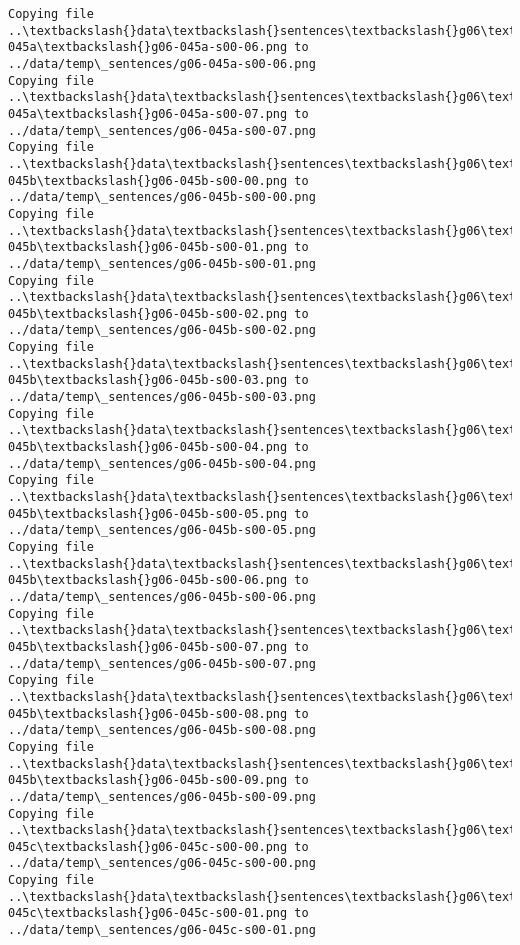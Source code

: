 \documentclass[11pt]{article}
\begin{document}
\begin{Verbatim}[commandchars=\\\{\}]
Copying file ..\textbackslash{}data\textbackslash{}sentences\textbackslash{}g06\textbackslash{}g06-045a\textbackslash{}g06-045a-s00-06.png to
../data/temp\_sentences/g06-045a-s00-06.png
Copying file ..\textbackslash{}data\textbackslash{}sentences\textbackslash{}g06\textbackslash{}g06-045a\textbackslash{}g06-045a-s00-07.png to
../data/temp\_sentences/g06-045a-s00-07.png
Copying file ..\textbackslash{}data\textbackslash{}sentences\textbackslash{}g06\textbackslash{}g06-045b\textbackslash{}g06-045b-s00-00.png to
../data/temp\_sentences/g06-045b-s00-00.png
Copying file ..\textbackslash{}data\textbackslash{}sentences\textbackslash{}g06\textbackslash{}g06-045b\textbackslash{}g06-045b-s00-01.png to
../data/temp\_sentences/g06-045b-s00-01.png
Copying file ..\textbackslash{}data\textbackslash{}sentences\textbackslash{}g06\textbackslash{}g06-045b\textbackslash{}g06-045b-s00-02.png to
../data/temp\_sentences/g06-045b-s00-02.png
Copying file ..\textbackslash{}data\textbackslash{}sentences\textbackslash{}g06\textbackslash{}g06-045b\textbackslash{}g06-045b-s00-03.png to
../data/temp\_sentences/g06-045b-s00-03.png
Copying file ..\textbackslash{}data\textbackslash{}sentences\textbackslash{}g06\textbackslash{}g06-045b\textbackslash{}g06-045b-s00-04.png to
../data/temp\_sentences/g06-045b-s00-04.png
Copying file ..\textbackslash{}data\textbackslash{}sentences\textbackslash{}g06\textbackslash{}g06-045b\textbackslash{}g06-045b-s00-05.png to
../data/temp\_sentences/g06-045b-s00-05.png
Copying file ..\textbackslash{}data\textbackslash{}sentences\textbackslash{}g06\textbackslash{}g06-045b\textbackslash{}g06-045b-s00-06.png to
../data/temp\_sentences/g06-045b-s00-06.png
Copying file ..\textbackslash{}data\textbackslash{}sentences\textbackslash{}g06\textbackslash{}g06-045b\textbackslash{}g06-045b-s00-07.png to
../data/temp\_sentences/g06-045b-s00-07.png
Copying file ..\textbackslash{}data\textbackslash{}sentences\textbackslash{}g06\textbackslash{}g06-045b\textbackslash{}g06-045b-s00-08.png to
../data/temp\_sentences/g06-045b-s00-08.png
Copying file ..\textbackslash{}data\textbackslash{}sentences\textbackslash{}g06\textbackslash{}g06-045b\textbackslash{}g06-045b-s00-09.png to
../data/temp\_sentences/g06-045b-s00-09.png
Copying file ..\textbackslash{}data\textbackslash{}sentences\textbackslash{}g06\textbackslash{}g06-045c\textbackslash{}g06-045c-s00-00.png to
../data/temp\_sentences/g06-045c-s00-00.png
Copying file ..\textbackslash{}data\textbackslash{}sentences\textbackslash{}g06\textbackslash{}g06-045c\textbackslash{}g06-045c-s00-01.png to
../data/temp\_sentences/g06-045c-s00-01.png

\end{Verbatim}
\end{document}
